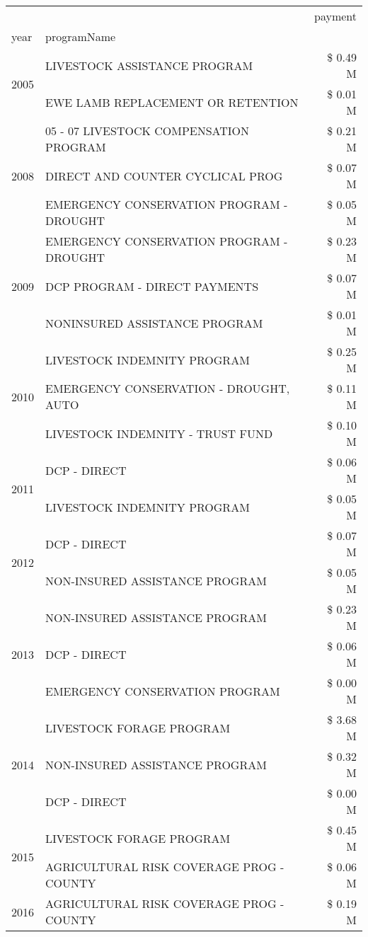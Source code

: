 \begin{tabular}{llr}
\toprule
 &  & payment \\
year & programName &  \\
\midrule
\multirow[t]{2}{*}{2005} & LIVESTOCK ASSISTANCE PROGRAM & \$ 0.49 M \\
 & EWE LAMB REPLACEMENT OR RETENTION & \$ 0.01 M \\
\cline{1-3}
\multirow[t]{3}{*}{2008} & 05 - 07 LIVESTOCK COMPENSATION PROGRAM & \$ 0.21 M \\
 & DIRECT AND COUNTER CYCLICAL PROG & \$ 0.07 M \\
 & EMERGENCY CONSERVATION PROGRAM - DROUGHT & \$ 0.05 M \\
\cline{1-3}
\multirow[t]{3}{*}{2009} & EMERGENCY CONSERVATION PROGRAM - DROUGHT & \$ 0.23 M \\
 & DCP PROGRAM - DIRECT PAYMENTS & \$ 0.07 M \\
 & NONINSURED ASSISTANCE PROGRAM & \$ 0.01 M \\
\cline{1-3}
\multirow[t]{3}{*}{2010} & LIVESTOCK INDEMNITY PROGRAM & \$ 0.25 M \\
 & EMERGENCY CONSERVATION - DROUGHT, AUTO & \$ 0.11 M \\
 & LIVESTOCK INDEMNITY - TRUST FUND & \$ 0.10 M \\
\cline{1-3}
\multirow[t]{2}{*}{2011} & DCP - DIRECT & \$ 0.06 M \\
 & LIVESTOCK INDEMNITY PROGRAM & \$ 0.05 M \\
\cline{1-3}
\multirow[t]{2}{*}{2012} & DCP - DIRECT & \$ 0.07 M \\
 & NON-INSURED ASSISTANCE PROGRAM & \$ 0.05 M \\
\cline{1-3}
\multirow[t]{3}{*}{2013} & NON-INSURED ASSISTANCE PROGRAM & \$ 0.23 M \\
 & DCP - DIRECT & \$ 0.06 M \\
 & EMERGENCY CONSERVATION PROGRAM & \$ 0.00 M \\
\cline{1-3}
\multirow[t]{3}{*}{2014} & LIVESTOCK FORAGE PROGRAM & \$ 3.68 M \\
 & NON-INSURED ASSISTANCE PROGRAM & \$ 0.32 M \\
 & DCP - DIRECT & \$ 0.00 M \\
\cline{1-3}
\multirow[t]{2}{*}{2015} & LIVESTOCK FORAGE PROGRAM & \$ 0.45 M \\
 & AGRICULTURAL RISK COVERAGE PROG - COUNTY & \$ 0.06 M \\
\cline{1-3}
\multirow[t]{3}{*}{2016} & AGRICULTURAL RISK COVERAGE PROG - COUNTY & \$ 0.19 M \\

\end{tabular}
